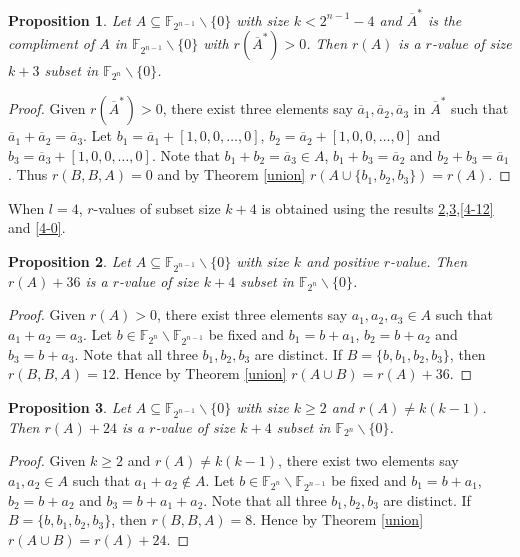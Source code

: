 \documentclass[12pt,a4paper]{article}
\newtheorem{prop}{Proposition}[section]
\begin{document}
	\begin{prop}\label{3-0}
		Let $A\subseteq\mathbb{F}_{2^{n-1}}\backslash\{0\}$ with size $k<2^{n-1}-4$ and $\overline{A}^*$ is the compliment of $A$ in $\mathbb{F}_{2^{n-1}}\backslash\{0\}$ with $r(\overline{A}^*)>0$. Then $r(A)$ is a $r$-value of size $k+3$ subset in $\mathbb{F}_{2^{n}}\backslash\{0\}$.
	\end{prop}
	\begin{proof}
		Given $r(\overline{A}^*)>0$, there exist three elements say $\overline{a}_1, \overline{a}_2,\overline{a}_3$ in $\overline{A}^*$ such that $\overline{a}_1+\overline{a}_2=\overline{a}_3$. Let $b_1=\overline{a}_1+[1,0,0,\dots,0]$, $b_2=\overline{a}_2+[1,0,0,\dots,0]$ and $b_3=\overline{a}_3+[1,0,0,\dots,0]$. Note that $b_1+b_2=\overline{a}_3\in A$, $b_1+b_3=\overline{a}_2$ and $b_2+b_3=\overline{a}_1$. Thus $r(B,B,A)=0$ and by Theorem \ref{union} $r(A\cup \{b_1,b_2,b_3\})=r(A)$.
	\end{proof}
	When $l=4$, $r$-values of subset size $k+4$ is obtained using the results \ref{4-36},\ref{4-24},\ref{4-12} and \ref{4-0}.
	\begin{prop}\label{4-36}
		Let $A\subseteq\mathbb{F}_{2^{n-1}}\backslash\{0\}$ with size $k$ and positive $r$-value.  Then $r(A)+36$ is a $r$-value of size $k+4$ subset in $\mathbb{F}_{2^{n}}\backslash\{0\}$.
	\end{prop}
	\begin{proof}
		Given $r(A)>0$, there exist three elements say $a_1,a_2,a_3\in A$ such that $a_1+a_2=a_3$. Let $b\in\mathbb{F}_{2^n}\backslash\mathbb{F}_{2^{n-1}}$ be fixed and $b_1=b+a_1$, $b_2=b+a_2$ and $b_3=b+a_3$. Note that all three $b_1,b_2,b_3$ are distinct. If $B=\{b,b_1,b_2,b_3\}$, then $r(B,B,A)=12$. Hence by Theorem \ref{union} $r(A\cup B)=r(A)+36$.
	\end{proof}
	
	\begin{prop}\label{4-24}
		Let $A\subseteq\mathbb{F}_{2^{n-1}}\backslash\{0\}$ with size $k\geq2$ and $r(A)\neq k(k-1)$. Then $r(A)+24$ is a $r$-value of size $k+4$ subset in $\mathbb{F}_{2^{n}}\backslash\{0\}$.
	\end{prop}
	\begin{proof}
		Given $k\geq2$ and $r(A)\neq k(k-1)$, there exist two elements say $a_1,a_2\in A$ such that $a_1+a_2\notin A$. Let $b\in\mathbb{F}_{2^n}\backslash\mathbb{F}_{2^{n-1}}$ be fixed and $b_1=b+a_1$, $b_2=b+a_2$ and $b_3=b+a_1+a_2$. Note that all three $b_1,b_2,b_3$ are distinct. If $B=\{b,b_1,b_2,b_3\}$, then $r(B,B,A)=8$. Hence by Theorem \ref{union} $r(A\cup B)=r(A)+24$.
	\end{proof}
	
\end{document}
